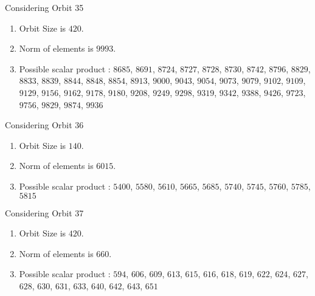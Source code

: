 \documentclass[12pt]{article}
\begin{document}
Considering Orbit 35
\begin{enumerate}
\item Orbit Size is $420$.
\item Norm of elements is $9993$.
\item Possible scalar product : $8685$, $8691$, $8724$, $8727$, $8728$, $8730$, $8742$, $8796$, $8829$, $8833$, $8839$, $8844$, $8848$, $8854$, $8913$, $9000$, $9043$, $9054$, $9073$, $9079$, $9102$, $9109$, $9129$, $9156$, $9162$, $9178$, $9180$, $9208$, $9249$, $9298$, $9319$, $9342$, $9388$, $9426$, $9723$, $9756$, $9829$, $9874$, $9936$
\end{enumerate}
Considering Orbit 36
\begin{enumerate}
\item Orbit Size is $140$.
\item Norm of elements is $6015$.
\item Possible scalar product : $5400$, $5580$, $5610$, $5665$, $5685$, $5740$, $5745$, $5760$, $5785$, $5815$
\end{enumerate}
Considering Orbit 37
\begin{enumerate}
\item Orbit Size is $420$.
\item Norm of elements is $660$.
\item Possible scalar product : $594$, $606$, $609$, $613$, $615$, $616$, $618$, $619$, $622$, $624$, $627$, $628$, $630$, $631$, $633$, $640$, $642$, $643$, $651$
\end{enumerate}
\end{document}
